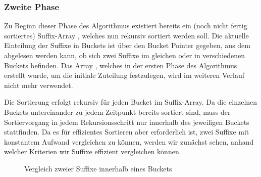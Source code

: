 \subsubsection{Zweite Phase}
\label{bpr:algorithmus:phase2}

Zu Beginn dieser Phase des Algorithmus existiert bereits ein (noch nicht fertig sortiertes) Suffix-Array \sa, welches nun rekursiv sortiert werden soll. Die aktuelle Einteilung der Suffixe in Buckets ist über den Bucket Pointer \bptr gegeben, aus dem abgelesen werden kann, ob sich zwei Suffixe im gleichen oder in verschiedenen Buckets befinden. Das Array \bkt, welches in der ersten Phase des Algorithmus erstellt wurde, um die initiale Zuteilung festzulegen, wird im weiteren Verlauf nicht mehr verwendet.\par
Die Sortierung erfolgt rekursiv für jeden Bucket im Suffix-Array. Da die einzelnen Buckets untereinander zu jedem Zeitpunkt bereits sortiert sind, muss der Sortiervorgang in jedem Rekursionsschritt nur innerhalb des jeweiligen Buckets stattfinden. Da es für effizientes Sortieren aber erforderlich ist, zwei Suffixe mit konstantem Aufwand vergleichen zu können, werden wir zunächst sehen, anhand welcher Kriterien wir Suffixe effizient vergleichen können.
\begin{figure}[ht]
	\caption{Vergleich zweier Suffixe innerhalb eines Buckets}
	\label{fig:inner_bucket}
\end{figure}
